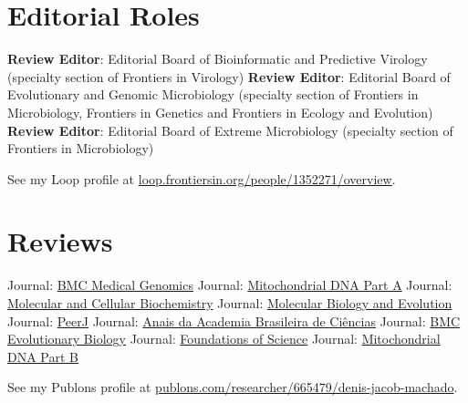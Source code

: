 
\section{Editorial Roles}

	    {\textbf{Review Editor}: Editorial Board of Bioinformatic and Predictive Virology (specialty section of Frontiers in Virology)}
    \cvline{---}
	    {\textbf{Review Editor}: Editorial Board of Evolutionary and Genomic Microbiology (specialty section of Frontiers in Microbiology, Frontiers in Genetics and Frontiers in Ecology and Evolution)}
    \cvline{---}
	    {\textbf{Review Editor}: Editorial Board of Extreme Microbiology (specialty section of Frontiers in Microbiology)}

    {\color{MyLightBlue} See my Loop profile at  \href{https://loop.frontiersin.org/people/1352271/overview}{loop.frontiersin.org/people/1352271/overview}.\\}

\section{Reviews}

	    {Journal: \href{https://bmcmedgenomics.biomedcentral.com/?gclid=CjwKCAjwrPCGBhALEiwAUl9X02eq5n6VLJ16fWlJrdFIVyGvqligO-_5N1em5soDXeFFqL7AyHJ6CxoCCX4QAvD_BwE}{BMC Medical Genomics}}
		{Journal: \href{https://www.tandfonline.com/loi/imdn20}{Mitochondrial DNA Part A}}
	\cvline{---}
	    {Journal: \href{https://www.springer.com/journal/11010/?gclid=Cj0KCQjwoJX8BRCZARIsAEWBFMLKBYnPcerYvwBvi0o_0fPoNuCnGz_5XU9lYKC91oSA7LozsZKev0saAuNLEALw_wcB}{Molecular and Cellular Biochemistry}}
	\cvline{---}
		{Journal: \href{https://academic.oup.com/mbe}{Molecular Biology and Evolution}}
	\cvline{---}
		{Journal: \href{https://peerj.com/}{PeerJ}}
	    {Journal: \href{https://www.scielo.br/scielo.php?script=sci_serial&pid=0001-3765&lng=en&nrm=iso}{Anais da Academia Brasileira de Ciências}}
	\cvline{---}
		{Journal: \href{https://bmcevolbiol.biomedcentral.com/}{BMC Evolutionary Biology}}
	\cvline{---}
		{Journal: \href{https://www.springer.com/journal/10699}{Foundations of Science}}
	\cvline{---}
		{Journal: \href{https://www.tandfonline.com/toc/tmdn20/current}{Mitochondrial DNA Part B}}

    {\color{MyLightBlue} See my Publons profile at  \href{https://publons.com/researcher/665479/denis-jacob-machado/}{publons.com/researcher/665479/denis-jacob-machado}.\\} 
